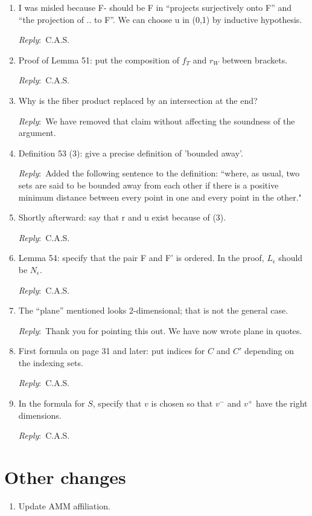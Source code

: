 \documentclass{amsart}
\newcommand{\ar}{\medskip\noindent\textit{Reply}:\ }
\newcommand{\cas}{\ar C.A.S.}
\begin{document}
\begin{enumerate}
	\item I was misled because F- should be F in “projects surjectively onto F” and “the projection of .. to F”. We can choose u in (0,1) by inductive hypothesis.

	\cas

	\item Proof of Lemma 51: put the composition of $f_T$ and $r_W$ between brackets.

	\cas

	\item Why is the fiber product replaced by an intersection at the end?

	\ar We have removed that claim without affecting the soundness of the argument.

	\item Definition 53 (3): give a precise definition of 'bounded away'.

	\ar Added the following sentence to the definition: ``where, as usual, two sets are said to be bounded away from each other if there is a positive minimum distance between every point in one and every point in the other."

	\item Shortly afterward: say that r and u exist because of (3).

	\cas

	\item Lemma 54: specify that the pair F and F' is ordered. In the proof, $L_\epsilon$ should be $N_\epsilon$.

	\cas

	\item The “plane” mentioned looks 2-dimensional; that is not the general case.

	\ar Thank you for pointing this out. We have now wrote plane in quotes.

	\item First formula on page 31 and later: put indices for $C$ and $C'$ depending on the indexing sets.

	\cas

	\item In the formula for $S$, specify that $v$ is chosen so that $v^-$ and $v^+$ have the right dimensions.

	\cas
\end{enumerate}

\section{Other changes}

\begin{enumerate}
	\item Update AMM affiliation.

\end{enumerate}
\end{document}
